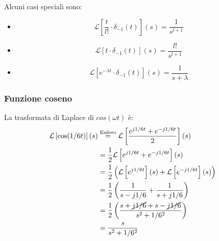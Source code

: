 \documentclass[a4paper]{article}
\begin{document}
\begin{example}
  Alcuni casi speciali sono:
  \begin{itemize}
    \item \[
        \mathcal{L}\left[ \frac{t}{l!} \cdot \delta_{-1}(t) \right](s) = \frac{1}{s^{l+1}}
    \] 

    \item
      \[
        \mathcal{L}\left[ t \cdot \delta_{-1}(t) \right](s) = \frac{l!}{s^{l+1}}
      \] 
      
    \item
      \[
        \mathcal{L}\left[ e^{-\lambda t} \cdot \delta_{-1}(t) \right](s) = \frac{1}{s+\lambda}
      \] 
  \end{itemize}
\end{example}

\subsubsection{Funzione coseno}
\begin{figure}[H]
  \centering
\end{figure}

La trasformata di Laplace di \( cos(\omega t) \) è:
\[
\begin{aligned}
  \mathcal{L}\left[ \cos(\omega t) \right](s) &\stackrel{\text{Eulero}}{=} \mathcal{L}\left[ \frac{e^{j \omega t} + e^{-j \omega t}}{2} \right](s)\\
                                              &= \frac{1}{2} \mathcal{L}\left[ e^{j \omega t} + e^{-j \omega t} \right](s)\\
                                              &= \frac{1}{2} \left( \mathcal{L}\left[ e^{j \omega t} \right](s) + \mathcal{L}\left[ e^{-j \omega t} \right](s) \right)\\
                                              &= \frac{1}{2} \left( \frac{1}{s-j \omega} + \frac{1}{s+j \omega} \right)\\
                                              &= \frac{1}{2} \left( \frac{s+\cancel{j \omega} + s-\cancel{j \omega}}{s^{2} + \omega^{2}} \right)\\
                                              &= \frac{s}{s^{2} + \omega^{2}}
\end{aligned}
\] 
\end{document}
